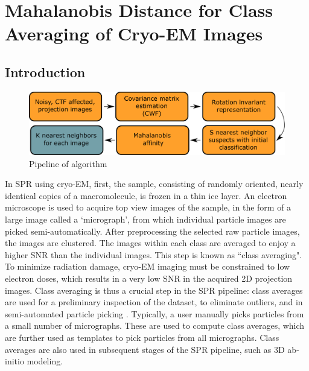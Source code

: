 \chapter{Mahalanobis Distance for Class Averaging of Cryo-EM Images}

\section{Introduction}
\label{sec:intro}
\begin{figure}
\begin{center}

\includegraphics[width=\columnwidth]{figures/pipeline.pdf}

\caption{Pipeline of algorithm}\label{fig:pipeline}
\end{center}

\end{figure}
 
In SPR using cryo-EM, first, the sample, consisting of randomly oriented, nearly identical copies of a macromolecule, is frozen in a thin ice layer. An electron microscope is used to acquire top view images of the sample, in the form of a large image called a `micrograph', from which individual particle images are picked semi-automatically. After preprocessing the selected raw particle images, the images are clustered. The images within each class are averaged to enjoy a higher SNR than the individual images. This step is known as ``class averaging". To minimize radiation damage, cryo-EM imaging must be constrained to low electron doses, which results in a very low SNR in the acquired 2D projection images. Class averaging is thus a crucial step in the SPR pipeline: class averages are used for a preliminary inspection of the dataset, to eliminate outliers, and in semi-automated particle picking \cite{relion}. Typically, a user manually picks particles from a small number of micrographs. These are used to compute class averages, which are further used as templates to pick particles from all micrographs. Class averages are also used in subsequent stages of the SPR pipeline, such as 3D ab-initio modeling.
 
